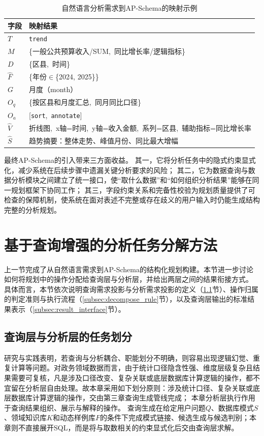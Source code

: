 \begin{table}[htbp]
	\setlength{\abovecaptionskip}{5pt}
	\setlength{\belowcaptionskip}{5pt}
	\caption{自然语言分析需求到AP-Schema的映射示例}\label{tab:ap_schema_example}
	\centering
	\footnotesize
    \renewcommand{\arraystretch}{1.2}
	\begin{tabular}{p{2cm}p{12.0cm}}
		\toprule
		字段 & 映射结果 \\
		\midrule
			$T$ & \texttt{trend} \\
			$M$ & \{一般公共预算收入/SUM,\ 同比增长率/逻辑指标\} \\
			$D$ & \{区县,\ 时间\} \\
			$\hat{F}$ & \{年份$\in$\{2024, 2025\}\} \\
			$G$ & 月度（month） \\
			$O_q$ & \{按区县和月度汇总,\ 同月同比口径\} \\
			$O_a$ & [\texttt{sort},\ \texttt{annotate}] \\
			$\hat{V}$ & 折线图,\ x轴=时间,\ y轴=收入金额,\ 系列=区县,\ 辅助指标=同比增长率 \\
			$\hat{S}$ & 趋势摘要：整体走势、峰值月份、同比最大增幅 \\
			\bottomrule
		\end{tabular}
\end{table}

最终AP-Schema的引入带来三方面收益。
其一，它将分析任务中的隐式约束显式化，减少系统在后续步骤中遗漏关键分析要求的风险；
其二，它为数据查询与数据分析模块之间建立了统一接口，使“取什么数据”和“如何组织分析结果”能够在同一规划框架下协同工作；
其三，字段约束关系和完备性校验为规划质量提供了可检查的保障机制，使系统在面对表述不完整或存在歧义的用户输入时仍能生成结构完整的分析规划。

\section{基于查询增强的分析任务分解方法}
上一节完成了从自然语言需求到AP-Schema的结构化规划构建。本节进一步讨论如何将规划中的操作分配给查询层与分析层，并给出两层之间的结果衔接方式。
具体而言，本节依次说明查询需求投影与分析需求投影的定义（\ref{subsec:task_partition}节）、操作归属的判定准则与执行流程（\ref{subsec:decompose_rule}节），以及查询层输出的标准结果表示（\ref{subsec:result_interface}节）。

\subsection{查询层与分析层的任务划分}\label{subsec:task_partition}
研究与实践表明，若查询与分析耦合、职能划分不明确，则容易出现逻辑幻觉、重复计算等问题。对政务领域数据而言，由于统计口径隐含性强、维度层级复杂且结果需要可复核，凡是涉及口径改变、复杂关联或底层数据库计算逻辑的操作，都不宜留在分析层自由处理。故本章采用如下划分原则：涉及统计口径、复杂关联或底层数据库计算逻辑的操作，交由第三章查询生成管线完成；
本章分析层执行作用于查询结果组织、展示与解释的操作。
查询生成在给定用户问题$Q$、数据库模式$S$、领域知识库$K$和动态样例库$F$的条件下完成模式链接、候选生成与候选判别；本章则不直接展开SQL，而是将与取数相关的约束显式化后交由查询层求解。

